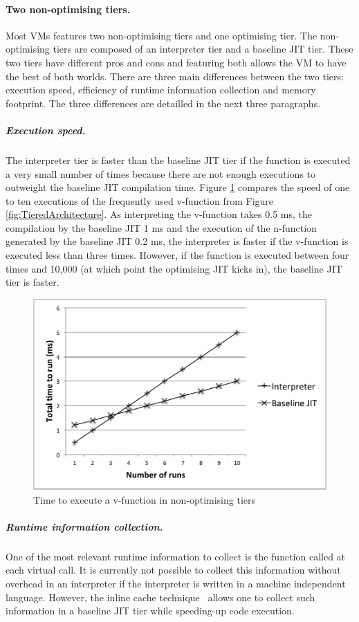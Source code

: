 \documentclass[a4paper,12pt,twoside]{../includes/ThesisStyle}
\begin{document}
\paragraph{Two non-optimising tiers.}Most VMs features two non-optimising tiers and one optimising tier. The non-optimising tiers are composed of an interpreter tier and a baseline JIT tier. These two tiers have different pros and cons and featuring both allows the VM to have the best of both worlds. There are three main differences between the two tiers: execution speed, efficiency of runtime information collection and memory footprint. The three differences are detailled in the next three paragraphs.

\subparagraph{Execution speed.} The interpreter tier is faster than the baseline JIT tier if the function is executed a very small number of times because there are not enough executions to outweight the baseline JIT compilation time. Figure \ref{fig:NonOptTierGraph} compares the speed of one to ten executions of the frequently used v-function from Figure \ref{fig:TieredArchitecture}. As interpreting the v-function takes 0.5 ms, the compilation by the baseline JIT 1 ms and the execution of the n-function generated by the baseline JIT 0.2 ms, the interpreter is faster if the v-function is executed less than three times. However, if the function is executed between four times and 10,000 (at which point the optimising JIT kicks in), the baseline JIT tier is faster.

\begin{figure}[h!]
    \begin{center}
        \includegraphics[width=0.70\linewidth]{NonOptTierGraph}
        \caption{Time to execute a v-function in non-optimising tiers}
        \label{fig:NonOptTierGraph}
    \end{center}
\end{figure}
	
	\subparagraph{Runtime information collection.} One of the most relevant runtime information to collect is the function called at each virtual call. It is currently not possible to collect this information without overhead in an interpreter if the interpreter is written in a machine independent language. However, the inline cache technique~\cite{Deut84a,Holz91a} allows one to collect such information in a baseline JIT tier while speeding-up code execution.
	
\end{document}
